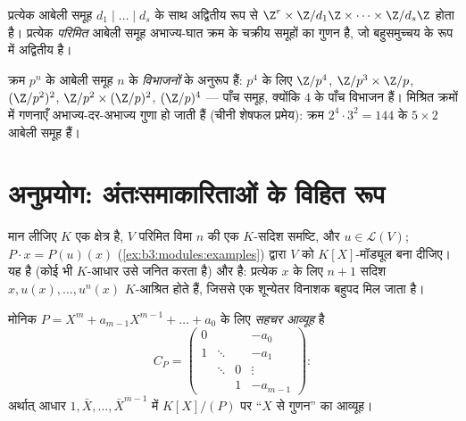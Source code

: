 \begin{corollary}[परिमिततः जनित आबेली समूह]
\label{cor:b3:modules:abelian}
प्रत्येक  आबेली समूह $d_1 \mid \dots \mid
d_s$ के साथ अद्वितीय रूप से
$\Z^r \times
\Z/d_1\Z\times\dots\times\Z/d_s\Z$ होता है। प्रत्येक \emph{परिमित} आबेली समूह अभाज्य-घात क्रम
के चक्रीय समूहों का गुणन है, जो बहुसमुच्चय के रूप में अद्वितीय
है।
\end{corollary}

\begin{example}\label{ex:b3:modules:abelian}
क्रम $p^n$ के आबेली समूह $n$ के \emph{विभाजनों} के अनुरूप हैं:
$p^4$ के लिए $\Z/p^4$, $\Z/p^3\times\Z/p$, $(\Z/p^2)^2$, $\Z/p^2 \times (\Z/p)^2$, $(\Z/p)^4$ --- पाँच समूह,
क्योंकि $4$ के पाँच विभाजन हैं। मिश्रित क्रमों में गणनाएँ
अभाज्य-दर-अभाज्य गुणा हो जाती हैं (चीनी शेषफल प्रमेय): क्रम
$2^4 \cdot 3^2 = 144$ के $5 \times 2$ आबेली समूह हैं।
\end{example}

\section{अनुप्रयोग: अंतःसमाकारिताओं के विहित रूप}

मान लीजिए $K$ एक क्षेत्र है, $V$ परिमित विमा $n$ की एक
$K$-सदिश समष्टि, और $u \in \mathcal L(V)$; $P
\cdot x = P(u)(x)$ (\cref{ex:b3:modules:examples}) द्वारा $V$ को
$K[X]$-मॉड्यूल बना दीजिए। यह   है (कोई भी
$K$-आधार उसे जनित करता है) और  है: प्रत्येक $x$ के लिए
$n+1$ सदिश $x, u(x), \dots, u^n(x)$ $K$-आश्रित होते हैं, जिससे एक शून्येतर
विनाशक बहुपद मिल जाता है।

\begin{definition}\label{def:b3:modules:companion}
मोनिक $P = X^m + a_{m-1}X^{m-1} + \dots + a_0$ के लिए \emph{सहचर आव्यूह} है
\[
C_P = \begin{pmatrix}
0 & & & -a_0\\
1 & \ddots & & -a_1\\
& \ddots & 0 & \vdots\\
& & 1 & -a_{m-1}
\end{pmatrix} :
\]
अर्थात् आधार $1, \bar X, \dots, \bar X^{m-1}$ में $K[X]/(P)$ पर ``$X$ से गुणन'' का आव्यूह।
\end{definition}

